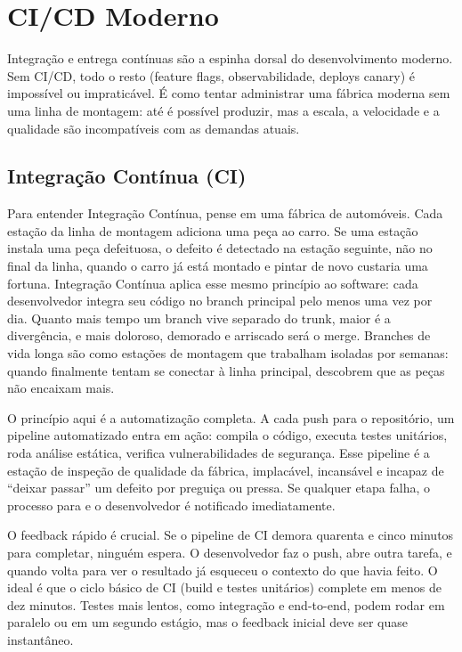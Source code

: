 \section{CI/CD Moderno}

Integração e entrega contínuas são a espinha dorsal do desenvolvimento moderno.
Sem CI/CD, todo o resto (feature flags, observabilidade, deploys canary)
é impossível ou impraticável. É como tentar administrar uma fábrica moderna sem
uma linha de montagem: até é possível produzir, mas a escala, a velocidade e
a qualidade são incompatíveis com as demandas atuais.

\subsection{Integração Contínua (CI)}

Para entender Integração Contínua, pense em uma fábrica de automóveis. Cada
estação da linha de montagem adiciona uma peça ao carro. Se uma estação instala
uma peça defeituosa, o defeito é detectado na estação seguinte, não no final
da linha, quando o carro já está montado e pintar de novo custaria uma fortuna.
Integração Contínua aplica esse mesmo princípio ao software: cada desenvolvedor
integra seu código no branch principal pelo menos uma vez por dia. Quanto mais
tempo um branch vive separado do trunk, maior é a divergência, e mais doloroso,
demorado e arriscado será o merge. Branches de vida longa são como estações de
montagem que trabalham isoladas por semanas: quando finalmente tentam se conectar
à linha principal, descobrem que as peças não encaixam mais.

O princípio aqui é a automatização completa. A cada push para o repositório,
um pipeline automatizado entra em ação: compila o código, executa testes unitários,
roda análise estática, verifica vulnerabilidades de segurança. Esse pipeline é a
estação de inspeção de qualidade da fábrica, implacável, incansável e incapaz
de ``deixar passar'' um defeito por preguiça ou pressa. Se qualquer etapa falha,
o processo para e o desenvolvedor é notificado imediatamente.

O feedback rápido é crucial. Se o pipeline de CI demora quarenta e cinco minutos
para completar, ninguém espera. O desenvolvedor faz o push, abre outra tarefa,
e quando volta para ver o resultado já esqueceu o contexto do que havia feito. O
ideal é que o ciclo básico de CI (build e testes unitários) complete em
menos de dez minutos. Testes mais lentos, como integração e end-to-end, podem
rodar em paralelo ou em um segundo estágio, mas o feedback inicial deve ser
quase instantâneo.


